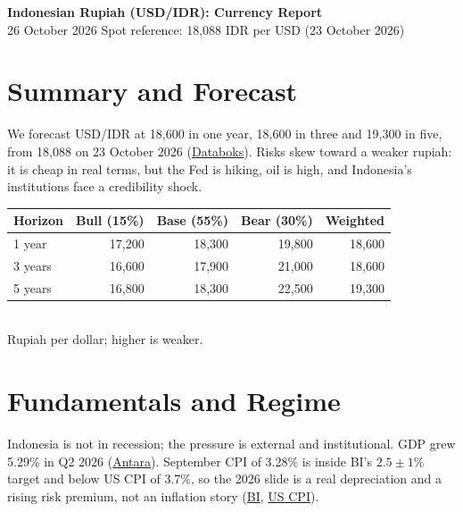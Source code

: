 \documentclass[10pt]{article}
\theoremstyle{plain}\newtheorem{proposition}{Proposition}
\theoremstyle{remark}\newtheorem*{remark}{Remark}
\begin{document}
\begin{center}
{\Large\bfseries Indonesian Rupiah (USD/IDR): Currency Report}\\[2pt]
{\small 26 October 2026 \quad Spot reference: 18,088 IDR per USD (23 October 2026)}
\end{center}

\section{Summary and Forecast}
We forecast USD/IDR at 18,600 in one year, 18,600 in three and 19,300 in five, from 18,088 on 23 October 2026 (\href{https://databoks.katadata.co.id/en/market/statistics/32ec67c22c32882/rupiah-exchange-rate-weakens-to-idr-180878-per-us-dollar-friday-23-october-2026}{Databoks}). Risks skew toward a weaker rupiah: it is cheap in real terms, but the Fed is hiking, oil is high, and Indonesia's institutions face a credibility shock.

\begin{center}
\small
\begin{tabular}{lrrrr}
\toprule
Horizon & Bull (15\%) & Base (55\%) & Bear (30\%) & Weighted \\
\midrule
1 year  & 17,200 & 18,300 & 19,800 & 18,600 \\
3 years & 16,600 & 17,900 & 21,000 & 18,600 \\
5 years & 16,800 & 18,300 & 22,500 & 19,300 \\
\bottomrule
\end{tabular}\\[2pt]
{\footnotesize Rupiah per dollar; higher is weaker.}
\end{center}

\section{Fundamentals and Regime}
Indonesia is not in recession; the pressure is external and institutional. GDP grew 5.29\% in Q2 2026 (\href{https://en.antaranews.com/news/425619/manufacturing-consumption-drive-indonesias-529-percent-q2-growth}{Antara}). September CPI of 3.28\% is inside BI's $2.5\pm1\%$ target and below US CPI of 3.7\%, so the 2026 slide is a real depreciation and a rising risk premium, not an inflation story (\href{https://www.bi.go.id/en/publikasi/ruang-media/news-release/Pages/sp_2823326.aspx}{BI}, \href{https://forexfundamentals.com/economic-calendar/us-cpi/2026-10-14}{US CPI}).
\end{document}
